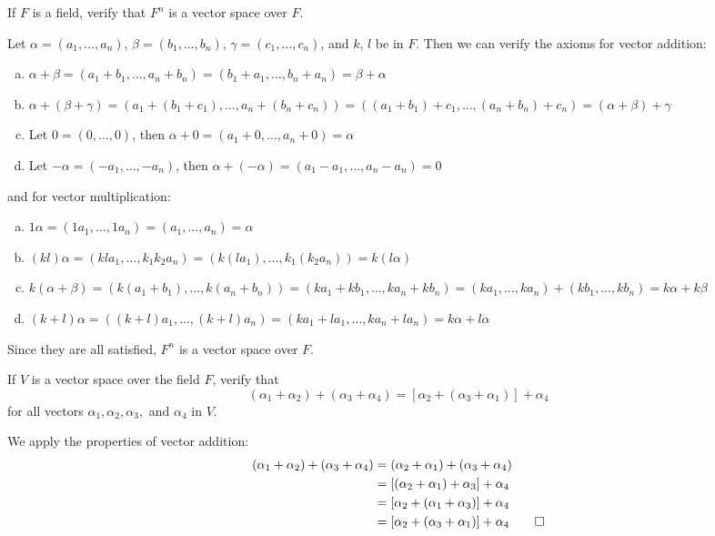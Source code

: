 \documentclass[notes]{agony}
\begin{document}
\begin{xca}\label{xca:211}
  If $F$ is a field, verify that $F^n$ is a vector space over $F$.
\end{xca}
\begin{prf}
  Let $\alpha = (a_1,\dotsc,a_n)$, $\beta = (b_1,\dotsc,b_n)$,
  $\gamma = (c_1,\dotsc,c_n)$, and $k$, $l$ be in $F$.
  Then we can verify the axioms for vector addition:
  \begin{enumerate}[(a)]
    \item $\alpha + \beta = (a_1+b_1,\dotsc,a_n+b_n) = (b_1+a_1,\dotsc,b_n+a_n) = \beta + \alpha$
    \item $\alpha + (\beta + \gamma) = (a_1+(b_1+c_1),\dotsc,a_n+(b_n+c_n)) = ((a_1+b_1)+c_1,\dotsc,(a_n+b_n)+c_n) = (\alpha + \beta) + \gamma$
    \item Let $0 = (0,\dotsc,0)$, then $\alpha+0 = (a_1+0,\dotsc,a_n+0) = \alpha$
    \item Let $-\alpha = (-a_1,\dotsc,-a_n)$, then $\alpha+(-\alpha) = (a_1-a_1,\dotsc,a_n-a_n) = 0$
  \end{enumerate}
  and for vector multiplication:
  \begin{enumerate}[(a)]
    \item $1\alpha = (1a_1,\dotsc,1a_n) = (a_1,\dotsc,a_n) = \alpha$
    \item $(k l)\alpha = (k l a_1,\dotsc,k_1 k_2 a_n) = (k(l a_1),\dotsc,k_1(k_2 a_n)) = k(l\alpha)$
    \item $k(\alpha+\beta) = (k(a_1+b_1),\dotsc,k(a_n+b_n)) = (ka_1+kb_1,\dotsc,ka_n+kb_n) = (ka_1,\dotsc,ka_n) + (kb_1,\dotsc,kb_n) = k\alpha + k\beta$
    \item $(k+l)\alpha = ((k+l)a_1,\dotsc,(k+l)a_n) = (ka_1+la_1,\dotsc,ka_n+la_n) = k\alpha + l\alpha$
  \end{enumerate}
  Since they are all satisfied, $F^n$ is a vector space over $F$.
\end{prf}

\begin{xca}
  If $V$ is a vector space over the field $F$, verify that
  \[ (\alpha_1 + \alpha_2) + (\alpha_3 + \alpha_4) = [\alpha_2 + (\alpha_3 + \alpha_1)] + \alpha_4 \]
  for all vectors $\alpha_1,\alpha_2,\alpha_3,$ and $\alpha_4$ in $V$.
\end{xca}
\begin{prf}
  We apply the properties of vector addition:
  \begin{align*}
    (\alpha_1 + \alpha_2) + (\alpha_3 + \alpha_4)
     & = (\alpha_2 + \alpha_1) + (\alpha_3 + \alpha_4)          \\
     & = [(\alpha_2 + \alpha_1) + \alpha_3] + \alpha_4          \\
     & = [\alpha_2 + (\alpha_1 + \alpha_3)] + \alpha_4          \\
     & = [\alpha_2 + (\alpha_3 + \alpha_1)] + \alpha_4 \qedhere
  \end{align*}
\end{prf}
\end{document}
